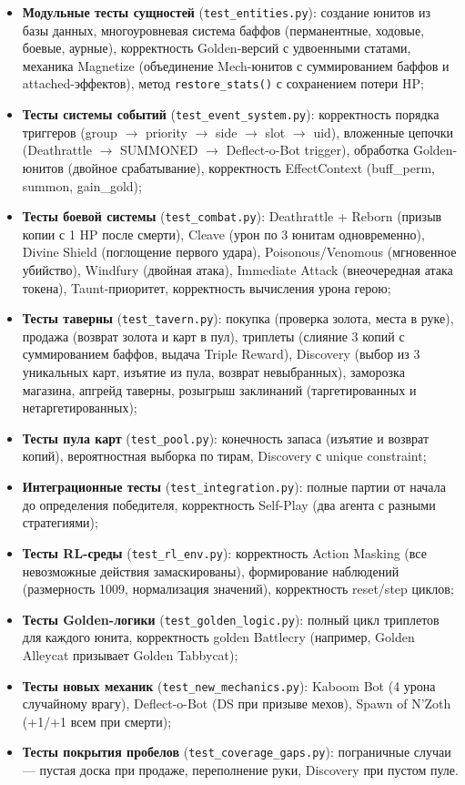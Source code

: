 \documentclass[a4paper,12pt]{extarticle}
\begin{document}
\begin{itemize}[noitemsep]
  \item \textbf{Модульные тесты сущностей} (\texttt{test\_entities.py}): создание юнитов из базы данных, многоуровневая система баффов (перманентные, ходовые, боевые, аурные), корректность Golden-версий с удвоенными статами, механика Magnetize (объединение Mech-юнитов с суммированием баффов и attached-эффектов), метод \texttt{restore\_stats()} с сохранением потери HP;
  \item \textbf{Тесты системы событий} (\texttt{test\_event\_system.py}): корректность порядка триггеров (group $\to$ priority $\to$ side $\to$ slot $\to$ uid), вложенные цепочки (Deathrattle $\to$ SUMMONED $\to$ Deflect-o-Bot trigger), обработка Golden-юнитов (двойное срабатывание), корректность EffectContext (buff\_perm, summon, gain\_gold);
  \item \textbf{Тесты боевой системы} (\texttt{test\_combat.py}): Deathrattle + Reborn (призыв копии с 1 HP после смерти), Cleave (урон по 3 юнитам одновременно), Divine Shield (поглощение первого удара), Poisonous/Venomous (мгновенное убийство), Windfury (двойная атака), Immediate Attack (внеочередная атака токена), Taunt-приоритет, корректность вычисления урона герою;
  \item \textbf{Тесты таверны} (\texttt{test\_tavern.py}): покупка (проверка золота, места в руке), продажа (возврат золота и карт в пул), триплеты (слияние 3 копий с суммированием баффов, выдача Triple Reward), Discovery (выбор из 3 уникальных карт, изъятие из пула, возврат невыбранных), заморозка магазина, апгрейд таверны, розыгрыш заклинаний (таргетированных и нетаргетированных);
  \item \textbf{Тесты пула карт} (\texttt{test\_pool.py}): конечность запаса (изъятие и возврат копий), вероятностная выборка по тирам, Discovery с unique constraint;
  \item \textbf{Интеграционные тесты} (\texttt{test\_integration.py}): полные партии от начала до определения победителя, корректность Self-Play (два агента с разными стратегиями);
  \item \textbf{Тесты RL-среды} (\texttt{test\_rl\_env.py}): корректность Action Masking (все невозможные действия замаскированы), формирование наблюдений (размерность 1009, нормализация значений), корректность reset/step циклов;
  \item \textbf{Тесты Golden-логики} (\texttt{test\_golden\_logic.py}): полный цикл триплетов для каждого юнита, корректность golden Battlecry (например, Golden Alleycat призывает Golden Tabbycat);
  \item \textbf{Тесты новых механик} (\texttt{test\_new\_mechanics.py}): Kaboom Bot (4 урона случайному врагу), Deflect-o-Bot (DS при призыве мехов), Spawn of N'Zoth (+1/+1 всем при смерти);
  \item \textbf{Тесты покрытия пробелов} (\texttt{test\_coverage\_gaps.py}): пограничные случаи --- пустая доска при продаже, переполнение руки, Discovery при пустом пуле.
\end{itemize}
\end{document}
